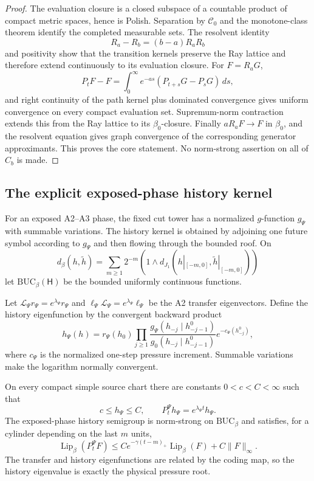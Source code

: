 \begin{proof}
The evaluation closure is a closed subspace of a countable product of compact
metric spaces, hence is Polish.  Separation by \(\mathscr C_0\) and the
monotone-class theorem identify the completed measurable sets.  The resolvent
identity
\[
 R_a-R_b=(b-a)R_aR_b
\]
and positivity show that the transition kernels preserve the Ray lattice and
therefore extend continuously to its evaluation closure.  For
\(F=R_aG\),
\[
 P_tF-F=\int_0^\infty e^{-as}
 (P_{t+s}G-P_sG)\,ds,
\]
and right continuity of the path kernel plus dominated convergence gives
uniform convergence on every compact evaluation set.  Supremum-norm
contraction extends this from the Ray lattice to its \(\beta_0\)-closure.
Finally \(aR_aF\to F\) in \(\beta_0\), and the resolvent equation gives graph
convergence of the corresponding generator approximants.  This proves the
core statement.  No norm-strong assertion on all of \(C_b\) is made.
\end{proof}

\subsection{The explicit exposed-phase history kernel}

For an exposed A2--A3 phase, the fixed cut tower has a normalized
\(g\)-function \(g_\Psi\) with summable variations.  The history kernel is
obtained by adjoining one future symbol according to \(g_\Psi\) and then
flowing through the bounded roof.  On
\[
 d_\beta(h,\tilde h)=
 \sum_{m\ge1}2^{-m}
 (1\wedge d_{J_1}(h|_{[-m,0]},\tilde h|_{[-m,0]}))
\]
let \(\mathrm{BUC}_\beta(\mathsf H)\) be the bounded uniformly continuous
functions.

Let \(\mathcal L_\Psi r_\Psi=e^{\lambda_\Psi}r_\Psi\) and
\(\ell_\Psi\mathcal L_\Psi=e^{\lambda_\Psi}\ell_\Psi\) be the A2 transfer
eigenvectors.  Define the history eigenfunction by the convergent backward
product
\[
 h_\Psi(h)=r_\Psi(h_0)
 \prod_{j\ge1}
 \frac{g_\Psi(h_{-j}\mid h_{-j-1}^{0})}
      {g_0(h_{-j}\mid h_{-j-1}^{0})}e^{-c_\Psi(h_{-j}^{0})},
\]
where \(c_\Psi\) is the normalized one-step pressure increment.  Summable
variations make the logarithm normally convergent.

\begin{theorem}
\label{thm:r5-a4-history-feller}
On every compact simple source chart there are constants
\(0<c<C<\infty\) such that
\[
 c\le h_\Psi\le C,
 \qquad P_t^\Psi h_\Psi=e^{\lambda_\Psi t}h_\Psi.
\]
The exposed-phase history semigroup is norm-strong on
\(\mathrm{BUC}_\beta\) and satisfies, for a cylinder depending on the last
\(m\) units,
\[
 \operatorname{Lip}_\beta(P_t^\Psi F)
 \le Ce^{-\gamma(t-m)_+}\operatorname{Lip}_\beta(F)
     +C\|F\|_\infty.
\]
The transfer and history eigenfunctions are related by the coding map, so the
history eigenvalue is exactly the physical pressure root.
\end{theorem}

